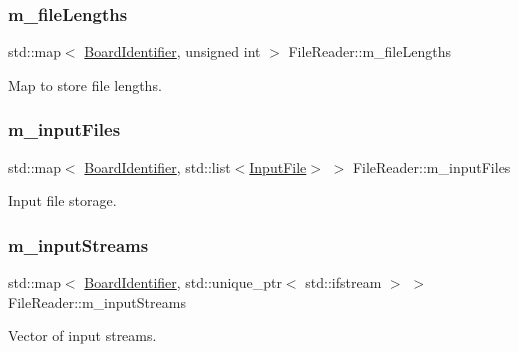 \subsubsection{\texorpdfstring{m\+\_\+file\+Lengths}{m\_fileLengths}}
{\footnotesize\ttfamily std\+::map$<$ \hyperlink{class_board_identifier}{Board\+Identifier}, unsigned int $>$ File\+Reader\+::m\+\_\+file\+Lengths\hspace{0.3cm}{\ttfamily [private]}}



Map to store file lengths. 

\mbox{\label{class_file_reader_a1b30d4ef75ca8de90c7271bc39ae320b}} 
\subsubsection{\texorpdfstring{m\+\_\+input\+Files}{m\_inputFiles}}
{\footnotesize\ttfamily std\+::map$<$ \hyperlink{class_board_identifier}{Board\+Identifier}, std\+::list$<$\hyperlink{class_input_file}{Input\+File}$>$ $>$ File\+Reader\+::m\+\_\+input\+Files\hspace{0.3cm}{\ttfamily [private]}}



Input file storage. 

\mbox{\label{class_file_reader_ad24e41220e68e1857fdef7df35c1d2da}} 
\subsubsection{\texorpdfstring{m\+\_\+input\+Streams}{m\_inputStreams}}
{\footnotesize\ttfamily std\+::map$<$ \hyperlink{class_board_identifier}{Board\+Identifier}, std\+::unique\+\_\+ptr$<$ std\+::ifstream $>$ $>$ File\+Reader\+::m\+\_\+input\+Streams\hspace{0.3cm}{\ttfamily [private]}}



Vector of input streams. 

\mbox{\label{class_file_reader_a2e6b51dae972af878f7751f2b6a54d75}} 
